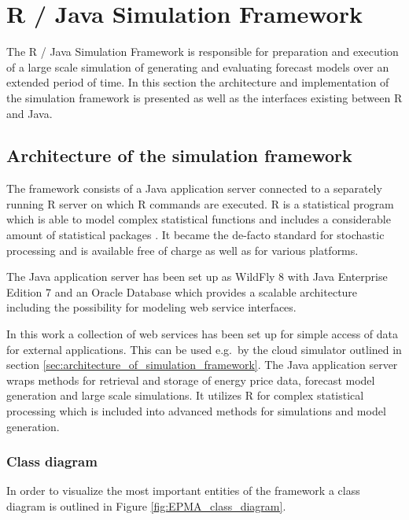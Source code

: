 \section{R / Java Simulation Framework} \label{sec:r_java_simulation_framework}

The R / Java Simulation Framework is responsible for preparation and execution of a large scale simulation of generating and evaluating forecast models over an extended period of time. In this section the architecture and implementation of the simulation framework is presented as well as the interfaces existing between R and Java. 


\subsection{Architecture of the simulation framework}

The framework consists of a Java application server connected to a separately running R server on which R commands are executed. R is a statistical program which is able to model complex statistical functions and includes a considerable amount of statistical packages \cite{r2016project}. It became the de-facto standard for stochastic processing and is available free of charge as well as for various platforms. 

The Java application server has been set up as WildFly 8 \cite{red2016wildfly} with Java Enterprise Edition 7 \cite{oracle2016java} and an Oracle Database \cite{oracle2016database} which provides a scalable architecture including the possibility for modeling web service interfaces. 

In this work a collection of web services has been set up for simple access of data for external applications. This can be used e.g.~by the cloud simulator outlined in section \ref{sec:architecture_of_simulation_framework}. The Java application server wraps methods for retrieval and storage of energy price data, forecast model generation and large scale simulations. It utilizes R for complex statistical processing which is included into advanced methods for simulations and model generation. 

\subsubsection{Class diagram}

In order to visualize the most important entities of the framework a class diagram is outlined in Figure \ref{fig:EPMA_class_diagram}.


